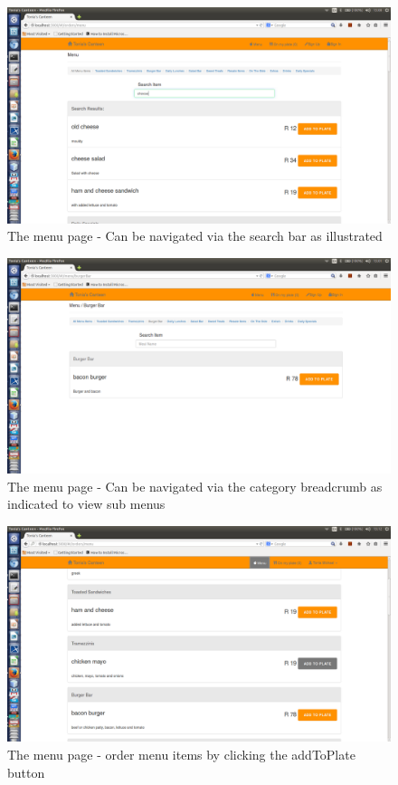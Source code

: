\documentclass[a4paper,12pt]{report}
\begin{document}
\begin{figure}[H]
  \centering
    \includegraphics[width=1.0\textwidth]{screenshots/searchCheese.png}
    \caption{The menu page - Can be navigated via the search bar as illustrated} 
\end{figure}

\begin{figure}[H]
  \centering
    \includegraphics[width=1.0\textwidth]{screenshots/catMenu.png}
    \caption{The menu page - Can be navigated via the category breadcrumb as indicated to view sub menus} 
\end{figure}

\begin{figure}[H]
  \centering
    \includegraphics[width=1.0\textwidth]{screenshots/addToPlate.png}
    \caption{The menu page - order menu items by clicking the addToPlate button } 
\end{figure}
\end{document}
